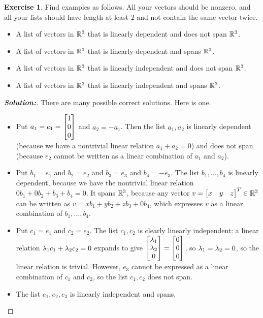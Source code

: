\documentclass[a4paper]{amsart}
\theoremstyle{definition}
\newtheorem{exercise}{Exercise}
\newenvironment{solution}{\begin{proof}[\textbf{Solution:}] \vphantom{u}}{\end{proof}}
\begin{document}
\begin{exercise}\label{ex-independent-iii}
 Find examples as follows.  All your vectors should be nonzero, and
 all your lists should have length at least $2$ and not contain the
 same vector twice.
 \begin{itemize}
  \item[(a)] A list of vectors in ${\mathbb{R}}^3$ that is linearly dependent
   and does not span ${\mathbb{R}}^3$.
  \item[(b)] A list of vectors in ${\mathbb{R}}^3$ that is linearly dependent
   and spans ${\mathbb{R}}^3$.
  \item[(c)] A list of vectors in ${\mathbb{R}}^3$ that is linearly independent
   and does not span ${\mathbb{R}}^3$.
  \item[(d)] A list of vectors in ${\mathbb{R}}^3$ that is linearly independent
   and spans ${\mathbb{R}}^3$.
 \end{itemize}
\end{exercise}
\begin{solution}
 There are many possible correct solutions.  Here is one.
 \begin{itemize}
  \item[(a)] Put $a_1=e_1=\left[\begin{matrix} 1\\0\\0\end{matrix}\right]$ and $a_2=-a_1$.  Then the
   list $a_1,a_2$ is linearly dependent (because we have a nontrivial
   linear relation $a_1+a_2=0$) and does not span (because $e_2$
   cannot be written as a linear combination of $a_1$ and $a_2$).
  \item[(b)] Put $b_1=e_1$ and $b_2=e_2$ and $b_3=e_3$ and
   $b_4=-e_3$.  The list $b_1,\dotsc,b_4$ is linearly dependent,
   because we have the nontrivial linear relation
   $0b_1+0b_2+b_3+b_4=0$.  It spans ${\mathbb{R}}^3$, because any vector
   $v=\left[\begin{matrix} x&y&z\end{matrix}\right]^T\in{\mathbb{R}}^3$ can be written as
   $v=xb_1+yb_2+zb_3+0b_4$, which expresses $v$ as a linear
   combination of $b_1,\dotsc,b_4$.
  \item[(c)] Put $c_1=e_1$ and $c_2=e_2$.  The list $c_1,c_2$ is
   clearly linearly independent: a linear relation
   $\lambda_1c_1+\lambda_2c_2=0$ expands to give
   $\left[\begin{matrix} \lambda_1\\\lambda_2\\0\end{matrix}\right]=\left[\begin{matrix} 0\\0\\0\end{matrix}\right]$, so $\lambda_1=\lambda_2=0$, so
   the linear relation is trivial.  However, $e_3$ cannot be expressed
   as a linear combination of $c_1$ and $c_2$, so the list $c_1,c_2$
   does not span.
  \item[(d)] The list $e_1,e_2,e_3$ is linearly independent and spans.
 \end{itemize}
\end{solution}
\end{document}
